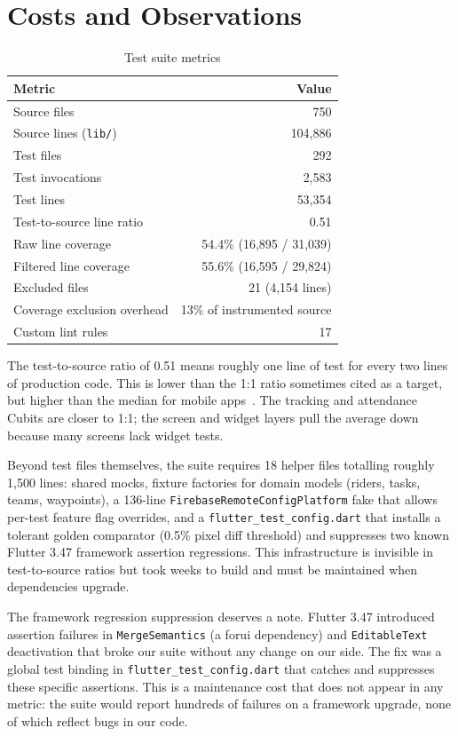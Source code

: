 \documentclass[10pt,journal,compsoc]{IEEEtran}
\begin{document}
\section{Costs and Observations}
\label{sec:costs}

\begin{table}[h]
\caption{Test suite metrics}
\label{tab:metrics}
\small
\begin{tabular}{@{}lr@{}}
\toprule
Metric & Value \\
\midrule
Source files & 750 \\
Source lines (\texttt{lib/}) & 104,886 \\
Test files & 292 \\
Test invocations & 2,583 \\
Test lines & 53,354 \\
Test-to-source line ratio & 0.51 \\
Raw line coverage & 54.4\% (16,895 / 31,039) \\
Filtered line coverage & 55.6\% (16,595 / 29,824) \\
Excluded files & 21 (4,154 lines) \\
Coverage exclusion overhead & 13\% of instrumented source \\
Custom lint rules & 17 \\
\bottomrule
\end{tabular}
\end{table}

The test-to-source ratio of 0.51 means roughly one line of test for every
two lines of production code. This is lower than the 1:1 ratio sometimes
cited as a target, but higher than the median for mobile
apps~\cite{kochhar2015understanding}. The tracking and attendance Cubits
are closer to 1:1; the screen and widget layers pull the average down
because many screens lack widget tests.

Beyond test files themselves, the suite requires 18 helper files totalling
roughly 1,500 lines: shared mocks, fixture factories for domain models
(riders, tasks, teams, waypoints), a 136-line
\texttt{FirebaseRemoteConfigPlatform} fake that allows per-test feature
flag overrides, and a \texttt{flutter\_test\_config.dart} that installs a
tolerant golden comparator (0.5\% pixel diff threshold) and suppresses
two known Flutter 3.47 framework assertion regressions. This
infrastructure is invisible in test-to-source ratios but took weeks to
build and must be maintained when dependencies upgrade.

The framework regression suppression deserves a note. Flutter 3.47
introduced assertion failures in \texttt{MergeSemantics} (a forui
dependency) and \texttt{EditableText} deactivation that broke our suite
without any change on our side. The fix was a global test binding in
\texttt{flutter\_test\_config.dart} that catches and suppresses these
specific assertions. This is a maintenance cost that does not appear in
any metric: the suite would report hundreds of failures on a framework
upgrade, none of which reflect bugs in our code.
\end{document}
